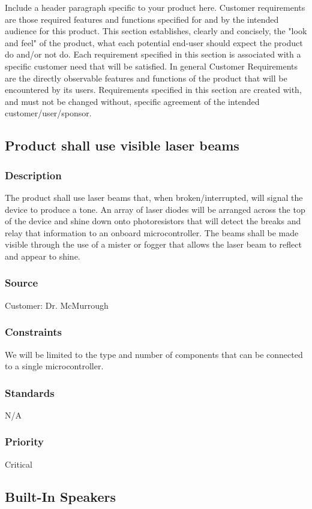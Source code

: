 Include a header paragraph specific to your product here. Customer requirements are those required features and functions specified for and by the intended audience for this product. This section establishes, clearly and concisely, the "look and feel" of the product, what each potential end-user should expect the product do and/or not do. Each requirement specified in this section is associated with a specific customer need that will be satisfied. In general Customer Requirements are the directly observable features and functions of the product that will be encountered by its users. Requirements specified in this section are created with, and must not be changed without, specific agreement of the intended customer/user/sponsor.

\subsection{Product shall use visible laser beams}
\subsubsection{Description}
The product shall use laser beams that, when broken/interrupted, will signal the device to produce a tone. An array of laser diodes will be arranged across the top of the device and shine down onto photoresistors that will detect the breaks and relay that information to an onboard microcontroller. The beams shall be made visible through the use of a mister or fogger that allows the laser beam to reflect and appear to shine.
\subsubsection{Source}
Customer: Dr. McMurrough
\subsubsection{Constraints}
We will be limited to the type and number of components that can be connected to a single microcontroller. 
\subsubsection{Standards}
N/A
\subsubsection{Priority}
Critical

\subsection{Built-In Speakers}
